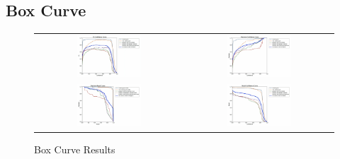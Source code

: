 \begin{refsection}
\subsection{Box Curve}
\begin{figure}[H]
\centering
\begin{tabular}{cc}
\includegraphics[width=0.45\textwidth]{figures/Fig18a.jpg} &
\includegraphics[width=0.45\textwidth]{figures/Fig18b.jpg} \\
\includegraphics[width=0.45\textwidth]{figures/Fig18c.jpg} &
\includegraphics[width=0.45\textwidth]{figures/Fig18d.jpg} \\
\end{tabular}
\caption{Box Curve Results}
\label{fig:box_curve}
\end{figure}


\end{refsection}
